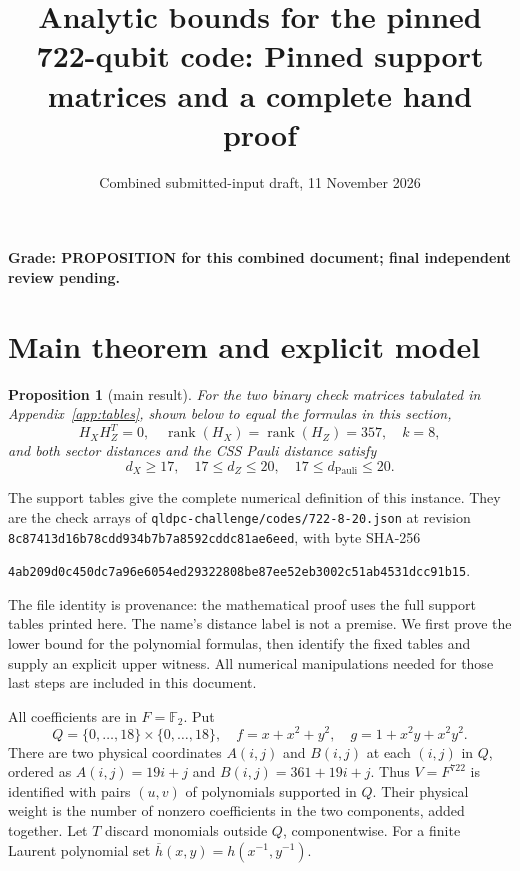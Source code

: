 \documentclass{article}
\title{Analytic bounds for the pinned 722-qubit code: Pinned support matrices and a complete hand proof}
\author{}
\date{Combined submitted-input draft, 11 November 2026}
\newtheorem{proposition}{Proposition}
\DeclareMathOperator{\rank}{rank}
\newcommand{\Ftwo}{\mathbb{F}_2}
\begin{document}
\maketitle

\textbf{Grade: PROPOSITION for this combined document; final independent review pending.}

\section{Main theorem and explicit model}\label{sec:main}

\begin{proposition}[main result]\label{prop:main}
  For the two binary check matrices tabulated in Appendix~\ref{app:tables}, shown
  below to equal the formulas in this section,
  \begin{equation}
    H_X H_Z^T = 0, \quad \rank(H_X) = \rank(H_Z) = 357, \quad k = 8,
  \end{equation}
  and both sector distances and the CSS Pauli distance satisfy
  \begin{equation}
    d_X \ge 17, \quad 17 \le d_Z \le 20, \quad 17 \le d_{\text{Pauli}} \le 20.
  \end{equation}
\end{proposition}

The support tables give the complete numerical definition of this instance. They are the check
arrays of \nolinkurl{qldpc-challenge/codes/722-8-20.json} at revision
\texttt{8c87413d16b78cdd934b7b7a8592cddc81ae6eed}, with byte SHA-256
\begin{center}
  \texttt{4ab209d0c450dc7a96e6054ed29322808be87ee52eb3002c51ab4531dcc91b15}.
\end{center}
 The file
identity is provenance: the mathematical proof uses the full support tables printed here. The
name's distance label is not a premise. We first prove the lower bound for the polynomial
formulas, then identify the fixed tables and supply an explicit upper witness. All numerical
manipulations needed for those last steps are included in this document.

All coefficients are in \(F = \Ftwo\). Put
\begin{equation}
  Q = \{0, \dots, 18\} \times \{0, \dots, 18\}, \quad
  f = x + x^2 + y^2, \quad g = 1 + x^2 y + x^2 y^2.
\end{equation}
There are two physical coordinates \(A(i,j)\) and \(B(i,j)\) at each \((i,j)\) in \(Q\), ordered
as \(A(i,j) = 19i + j\) and \(B(i,j) = 361 + 19i + j\). Thus \(V = F^{722}\) is identified with
pairs \((u,v)\) of polynomials supported in \(Q\). Their physical weight is the number of nonzero
coefficients in the two components, added together. Let \(T\) discard monomials outside \(Q\),
componentwise. For a finite Laurent polynomial set \(\overline{h}(x,y) = h(x^{-1}, y^{-1})\).
\end{document}
